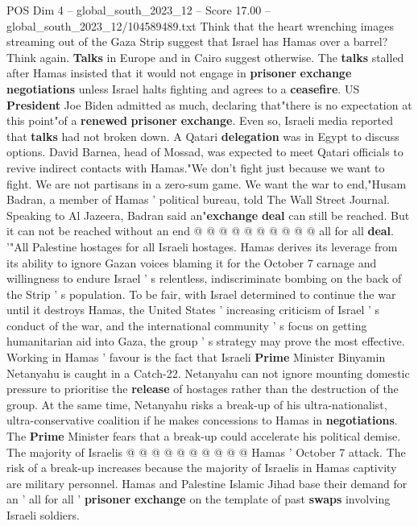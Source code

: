 \begin{textsample}{POS Dim 4 – global\_south\_2023\_12 – Score 17.00 – global\_south\_2023\_12/104589489.txt}  \label{ex:f4_pos_138}
Think that the heart wrenching images streaming out of the Gaza Strip suggest that Israel has Hamas over a barrel?
Think again. \textbf{Talks} in Europe and in Cairo suggest otherwise.
The \textbf{talks} stalled after Hamas insisted that it would not engage in \textbf{prisoner} \textbf{exchange} \textbf{negotiations} unless Israel halts fighting and agrees to a \textbf{ceasefire}.
US \textbf{President} Joe Biden admitted as much, declaring that"there is no expectation at this point"of a \textbf{renewed} \textbf{prisoner} \textbf{exchange}.
Even so, Israeli media reported that \textbf{talks} had not broken down.
A Qatari \textbf{delegation} was in Egypt to discuss options.
David Barnea, head of Mossad, was expected to meet Qatari officials to revive indirect contacts with Hamas."We don't fight just because we want to fight.
We are not partisans in a zero-sum game.
We want the war to end,"Husam Badran, a member of Hamas ' political bureau, told The Wall Street Journal.
Speaking to Al Jazeera, Badran said an"\textbf{exchange} \textbf{deal} can still be reached.
But it can not be reached without an end @ @ @ @ @ @ @ @ @ @ all for all \textbf{deal}. '"All Palestine hostages for all Israeli hostages.
Hamas derives its leverage from its ability to ignore Gazan voices blaming it for the October 7 carnage and willingness to endure Israel ' s relentless, indiscriminate bombing on the back of the Strip ' s population.
To be fair, with Israel determined to continue the war until it destroys Hamas, the United States ' increasing criticism of Israel ' s conduct of the war, and the international community ' s focus on getting humanitarian aid into Gaza, the group ' s strategy may prove the most effective.
Working in Hamas ' favour is the fact that Israeli \textbf{Prime} Minister Binyamin Netanyahu is caught in a Catch-22.
Netanyahu can not ignore mounting domestic pressure to prioritise the \textbf{release} of hostages rather than the destruction of the group.
At the same time, Netanyahu risks a break-up of his ultra-nationalist, ultra-conservative coalition if he makes concessions to Hamas in \textbf{negotiations}.
The \textbf{Prime} Minister fears that a break-up could accelerate his political demise.
The majority of Israelis @ @ @ @ @ @ @ @ @ @ Hamas ' October 7 attack.
The risk of a break-up increases because the majority of Israelis in Hamas captivity are military personnel.
Hamas and Palestine Islamic Jihad base their demand for an ' all for all ' \textbf{prisoner} \textbf{exchange} on the template of past \textbf{swaps} involving Israeli soldiers.

\end{textsample}
